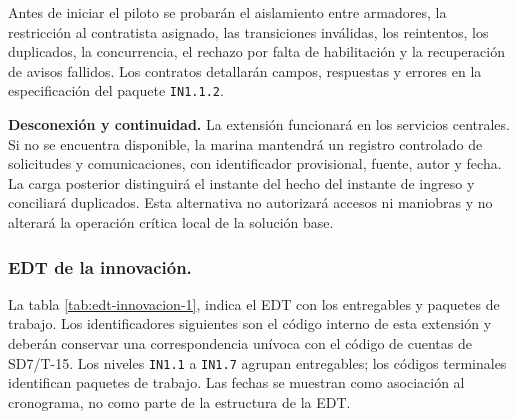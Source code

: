 Antes de iniciar el piloto se probarán el aislamiento entre armadores, la restricción al contratista asignado, las transiciones inválidas, los reintentos, los duplicados, la concurrencia, el rechazo por falta de habilitación y la recuperación de avisos fallidos. Los contratos detallarán campos, respuestas y errores en la especificación del paquete \texttt{IN1.1.2}.

\textbf{Desconexión y continuidad.}
La extensión funcionará en los servicios centrales. Si no se encuentra disponible, la marina mantendrá un registro controlado de solicitudes y comunicaciones, con identificador provisional, fuente, autor y fecha. La carga posterior distinguirá el instante del hecho del instante de ingreso y conciliará duplicados. Esta alternativa no autorizará accesos ni maniobras y no alterará la operación crítica local de la solución base.

\subsubsection{EDT de la innovación.}
La tabla \ref{tab:edt-innovacion-1}, indica el EDT con los entregables y paquetes de trabajo. Los identificadores siguientes son el código interno de esta extensión y deberán conservar una correspondencia unívoca con el código de cuentas de SD7/T-15. Los niveles \texttt{IN1.1} a \texttt{IN1.7} agrupan entregables; los códigos terminales identifican paquetes de trabajo. Las fechas se muestran como asociación al cronograma, no como parte de la estructura de la EDT.


